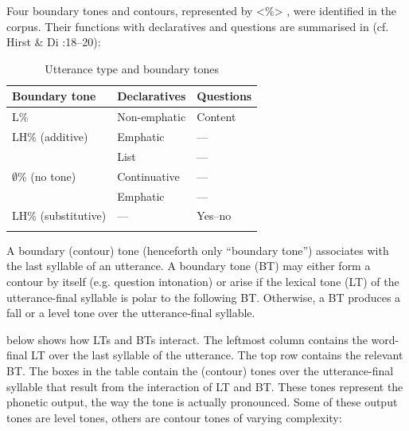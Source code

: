 Four boundary tones and contours, represented by <\%> \citep{Pierrehumbert1980}, were identified in the corpus. Their functions with declaratives and questions are summarised in  (cf. Hirst \& Di \citealt{Cristo1998}:18–20):


\begin{table}
\caption{Utterance type and boundary tones}
\label{tab:key:3.5}

\begin{tabularx}{.8\textwidth}{XXl}
\lsptoprule

{Boundary tone} & {Declaratives} & {Questions}\\
\midrule
L\% & Non-emphatic & Content\\
LH\% (additive) & Emphatic & {}---\\
& List & {}---\\
${\emptyset}$\% (no tone) & Continuative & {}---\\
& Emphatic & {}---\\
LH\% (substitutive) & {}--- & Yes–no\\
\lspbottomrule
\end{tabularx}
\end{table}

A boundary (contour) tone (henceforth only “boundary tone”) associates with the last syllable of an utterance. A boundary tone (BT) may either form a contour by itself (e.g. question intonation) or arise if the lexical tone (LT) of the utterance-final syllable is polar to the following BT. Otherwise, a BT produces a fall or a level tone over the utterance-final syllable.

 below shows how LTs and BTs interact. The leftmost column contains the word-final LT over the last syllable of the utterance. The top row contains the relevant BT. The boxes in the table contain the (contour) tones over the utterance-final syllable that result from the interaction of LT and BT. These tones represent the phonetic output, the way the tone is actually pronounced. Some of these output tones are level tones, others are contour tones of varying complexity:


